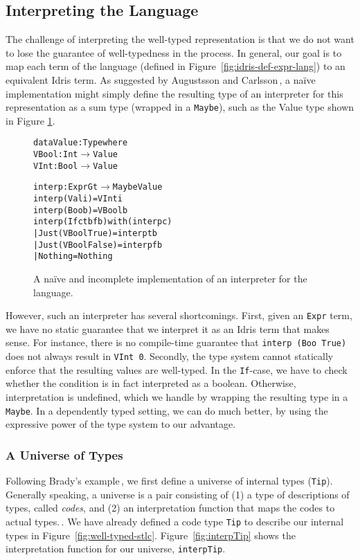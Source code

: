 \subsection{Interpreting the Language}
The challenge of interpreting the well-typed representation is that we do not want to lose the guarantee of well-typedness in the process. In general, our goal is to map each term of the language (defined in Figure~\ref{fig:idris-def-expr-lang}) to an equivalent Idris term. As suggested by Augustsson and Carlsson\,\cite{Augustsson99anexercise}, a na\"{i}ve implementation might simply define the resulting type of an interpreter for this representation as a sum type (wrapped in a \texttt{Maybe}), such as the Value type shown in Figure \ref{fig:naive-interpreter-impl}.

\begin{figure}
\begin{alltt}
data Value : Type where
  VBool : Int \(\to\) Value
  VInt  : Bool \(\to\) Value

interp : Expr G t \(\to\) Maybe Value
interp (Val i) = VInt i
interp (Boo b) = VBool b
interp (If c tb fb) with (interp c)
  | Just (VBool True)  = interp tb
  | Just (VBool False) = interp fb
  | Nothing            = Nothing
\end{alltt}
\caption{A na\"{i}ve and incomplete implementation of an interpreter for the language.}
\label{fig:naive-interpreter-impl}
\end{figure}

However, such an interpreter has several shortcomings. First, given an \texttt{Expr} term, we have no static guarantee that we interpret it as an Idris term that makes sense. For instance, there is no compile-time guarantee that \texttt{interp (Boo True)} does not always result in \texttt{VInt 0}. Secondly, the type system cannot statically enforce that the resulting values are well-typed. In the \texttt{If}-case, we have to check whether the condition is in fact interpreted as a boolean. Otherwise, interpretation is undefined, which we handle by wrapping the resulting type in a \texttt{Maybe}. In a dependently typed setting, we can do much better, by using the expressive power of the type system to our advantage.

\subsubsection{A Universe of Types}
Following Brady's example\,\cite{Brady:IdrisTutorial}, we first define a universe of internal types (\texttt{Tip}). Generally speaking, a universe is a pair consisting of (1) a type of descriptions of types, called \emph{codes}, and (2) an interpretation function that maps the codes to actual types.\,\cite{Oury:2008}. We have already defined a code type \texttt{Tip} to describe our internal types in Figure~\ref{fig:well-typed-stlc}. Figure~\ref{fig:interpTip} shows the interpretation function for our universe, \texttt{interpTip}.

